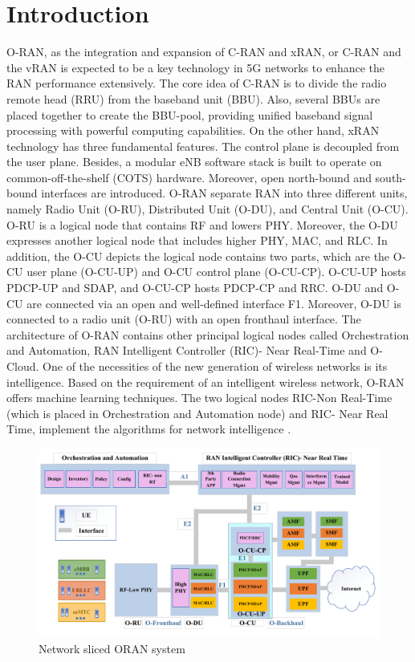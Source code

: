 \documentclass{article}
\begin{document}
\section{Introduction} 
O-RAN, as the integration and expansion of C-RAN and xRAN, or C-RAN and the vRAN is expected to be a key technology in 5G networks to enhance the RAN performance extensively. 
The core idea of C-RAN is to divide the radio remote head (RRU) from the baseband unit (BBU). Also, several BBUs are placed together to create the BBU-pool, providing unified baseband signal processing with powerful computing capabilities. On the other hand, xRAN technology has three fundamental features. The control plane is decoupled from the user plane. Besides, a modular eNB software stack is built to operate on common-off-the-shelf (COTS) hardware. Moreover, open north-bound and south-bound interfaces are introduced.
O-RAN separate RAN into three different units, namely Radio Unit (O-RU), Distributed Unit (O-DU), and Central Unit (O-CU). O-RU is a logical node that contains RF and lowers PHY. Moreover, the O-DU expresses another logical node that includes higher PHY, MAC, and RLC. In addition, the O-CU depicts the logical node contains two parts, which are the O-CU user plane (O-CU-UP) and O-CU control plane (O-CU-CP). O-CU-UP hosts PDCP-UP and SDAP, and O-CU-CP hosts PDCP-CP and RRC. O-DU and O-CU are connected via an open and well-defined interface F1.
Moreover, O-DU is connected to a radio unit (O-RU) with an open fronthaul interface.
The architecture of O-RAN contains other principal logical nodes called Orchestration and Automation,
RAN Intelligent Controller (RIC)- Near Real-Time and O-Cloud. 
One of the necessities of the new generation of wireless networks is its intelligence.
Based on the requirement of an intelligent wireless network, O-RAN offers machine learning techniques. The two logical nodes RIC-Non Real-Time (which is placed in Orchestration and Automation node) and RIC- Near Real Time, implement the algorithms for network intelligence 
\cite{gavrilovska2020cloud,niknam2020intelligent,kazemifard2021minimum,both2021system,ORANArch,ORANML,lin2021toward}.
\begin{figure}
  \centering 
    \includegraphics[scale = 0.6]{finalDraw.pdf}
  \caption{Network sliced ORAN system}
  \label{fig:c11}
\end{figure}
\end{document}
